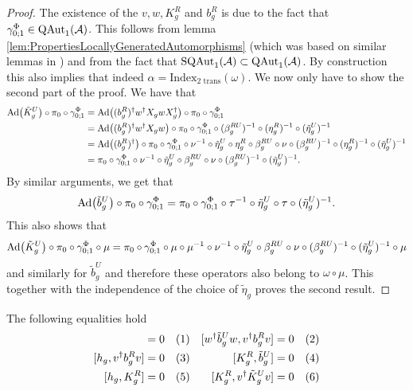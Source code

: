 \documentclass[11pt,a4paper,twoside]{article}
\numberwithin{equation}{section}
\begin{document}
	\begin{proof}
		The existence of the $v,w,K_g^R$ and $b_g^R$ is due to the fact that $\gamma^\Phi_{0;1}\in \QAut{\AA}$. This follows from lemma \ref{lem:PropertiesLocallyGeneratedAutomorphisms} (which was based on similar lemmas in \cite{ogata2021h3gmathbb}) and from the fact that $\textrm{SQAut}_1(\AA)\subset \QAut{\AA}$. By construction this also implies that indeed $\alpha=\textrm{Index}_{\text{2 trans}}(\omega)$. We now only have to show the second part of the proof. We have that
		\begin{align}
			\Ad{\tilde{K}_g^U}\circ\pi_0\circ\gamma^\Phi_{0;1}&=\Ad{(b_g^R)^\dagger w^\dagger X_g w X_g^\dagger}\circ\pi_0\circ\gamma^\Phi_{0;1}\\
			&=\Ad{(b_g^R)^\dagger w^\dagger X_g w}\circ\pi_0\circ\gamma^\Phi_{0;1}\circ(\beta_g^{RU})^{-1}\circ(\eta_g^R)^{-1}\circ(\tilde{\eta}_g^U)^{-1}\\
			&=\Ad{(b_g^R)^\dagger}\circ\pi_0\circ\gamma^\Phi_{0;1}\circ\nu^{-1}\circ\tilde{\eta}_g^U\circ\eta_g^R\circ\beta_g^{RU}\circ\nu\circ(\beta_g^{RU})^{-1}\circ(\eta_g^R)^{-1}\circ(\tilde{\eta}_g^U)^{-1}\\
			&=\pi_0\circ\gamma^\Phi_{0;1}\circ\nu^{-1}\circ\tilde{\eta}_g^U\circ\beta_g^{RU}\circ\nu\circ(\beta_g^{RU})^{-1}\circ(\tilde{\eta}_g^U)^{-1}.
		\end{align}
		By similar arguments, we get that
		\begin{equation}
			\Ad{\tilde{b}_g^U}\circ\pi_0\circ\gamma^\Phi_{0;1}=\pi_0\circ\gamma^\Phi_{0;1}\circ\tau^{-1}\circ\tilde{\eta}_g^U\circ\tau\circ(\tilde{\eta}_g^U)^{-1}.
		\end{equation}
		This also shows that
		\begin{equation}
			\Ad{\tilde{K}_g^U}\circ\pi_0\circ\gamma^\Phi_{0;1}\circ\mu=\pi_0\circ\gamma^\Phi_{0;1}\circ\mu\circ\mu^{-1}\circ\nu^{-1}\circ\tilde{\eta}_g^U\circ\beta_g^{RU}\circ\nu\circ(\beta_g^{RU})^{-1}\circ(\tilde{\eta}_g^U)^{-1}\circ\mu
		\end{equation}
		and similarly for $\tilde{b}_g^U$ and therefore these operators also belong to $\omega\circ\mu$. This together with the independence of the choice of $\tilde{\eta}_g$ proves the second result.
	\end{proof}
	\begin{lemma}
		The following equalities hold
		\begin{align*}
			[h_g ,w^\dagger \tilde{b}_g^U w]&=0 \Label{eq:H^1IndexRotationInvariantCommutator1}& [w^\dagger \tilde{b}_g^U w,v^\dagger b_g^R v]&=0 \Label{eq:H^1IndexRotationInvariantCommutator4}\\
			[h_g, v^\dagger b_g^R v]&=0 \Label{eq:H^1IndexRotationInvariantCommutator2}& [K_g^R,\tilde{b}_g^U] &= 0 \Label{eq:H^1IndexRotationInvariantCommutator5}\\
			[h_g ,K_g^R]&=0 \Label{eq:H^1IndexRotationInvariantCommutator3}& [K_g^R,v^\dagger \tilde{K}^U_g v] &= 0 \Label{eq:H^1IndexRotationInvariantCommutator6}
		\end{align*}
	\end{lemma}
\end{document}
